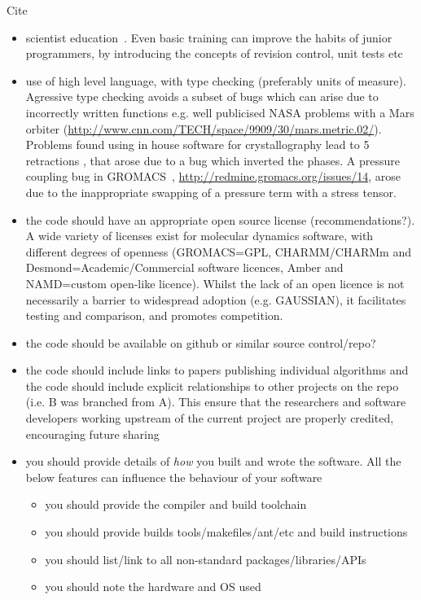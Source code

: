 \documentclass[conference]{IEEEtran}
\begin{document}
Cite~\cite{collberg-et-al:2014}

\begin{itemize}
\item scientist education~\cite{Wilson2014}. Even basic training can improve the habits of junior programmers, by introducing the concepts of revision control, unit tests etc
\item use of high level language, with type checking (preferably units of measure). Agressive type checking avoids a subset of bugs which can arise due to incorrectly written functions e.g. well publicised NASA problems with a Mars orbiter (\url{http://www.cnn.com/TECH/space/9909/30/mars.metric.02/}). Problems found using in house software for crystallography lead to 5 retractions \cite{Miller2006}, that arose due to a bug which inverted the phases. A pressure coupling bug in GROMACS~\cite{Hess2008}, \url{http://redmine.gromacs.org/issues/14}, arose due to the inappropriate swapping of a pressure term with a stress tensor.
\item the code should have an appropriate open source license (recommendations?). A wide variety of licenses exist for molecular dynamics software, with different degrees of openness (GROMACS=GPL, CHARMM/CHARMm and Desmond=Academic/Commercial software licences, Amber and NAMD=custom open-like licence). Whilst the lack of an open licence is not necessarily a barrier to widespread adoption (e.g. GAUSSIAN), it facilitates testing and comparison, and promotes competition.
\item the code should be available on github or similar source control/repo?
\item the code should include links to papers publishing individual algorithms and the code should include explicit relationships to other projects on the repo (i.e. B was branched from A). This ensure that the researchers and software developers working upstream of the current project are properly credited, encouraging future sharing
\item you should provide details of \emph{how} you built and wrote the software. All the below features can influence the behaviour of your software
\begin{itemize}
\item you should provide the compiler and build toolchain
\item you should provide builds tools/makefiles/ant/etc and build instructions
\item you should list/link to all non-standard packages/libraries/APIs
\item you should note the hardware and OS used

\end{itemize}
\end{itemize}
\end{document}

